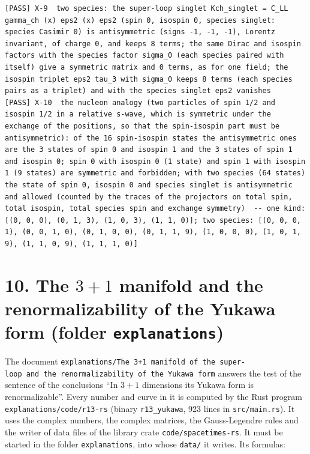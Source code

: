 \documentclass[
  10pt,
]{article}
\begin{document}
\begin{verbatim}
[PASS] X-9  two species: the super-loop singlet Kch_singlet = C_LL gamma_ch (x) eps2 (x) eps2 (spin 0, isospin 0, species singlet: species Casimir 0) is antisymmetric (signs -1, -1, -1), Lorentz invariant, of charge 0, and keeps 8 terms; the same Dirac and isospin factors with the species factor sigma_0 (each species paired with itself) give a symmetric matrix and 0 terms, as for one field; the isospin triplet eps2 tau_3 with sigma_0 keeps 8 terms (each species pairs as a triplet) and with the species singlet eps2 vanishes
[PASS] X-10  the nucleon analogy (two particles of spin 1/2 and isospin 1/2 in a relative s-wave, which is symmetric under the exchange of the positions, so that the spin-isospin part must be antisymmetric): of the 16 spin-isospin states the antisymmetric ones are the 3 states of spin 0 and isospin 1 and the 3 states of spin 1 and isospin 0; spin 0 with isospin 0 (1 state) and spin 1 with isospin 1 (9 states) are symmetric and forbidden; with two species (64 states) the state of spin 0, isospin 0 and species singlet is antisymmetric and allowed (counted by the traces of the projectors on total spin, total isospin, total species spin and exchange symmetry)  -- one kind: [(0, 0, 0), (0, 1, 3), (1, 0, 3), (1, 1, 0)]; two species: [(0, 0, 0, 1), (0, 0, 1, 0), (0, 1, 0, 0), (0, 1, 1, 9), (1, 0, 0, 0), (1, 0, 1, 9), (1, 1, 0, 9), (1, 1, 1, 0)]
\end{verbatim}

\hypertarget{the-31-manifold-and-the-renormalizability-of-the-yukawa-form-folder-explanations}{%
\section{\texorpdfstring{10. The \(3+1\) manifold and the
renormalizability of the Yukawa form (folder
\texttt{explanations})}{10. The 3+1 manifold and the renormalizability of the Yukawa form (folder explanations)}}\label{the-31-manifold-and-the-renormalizability-of-the-yukawa-form-folder-explanations}}

The document
\texttt{explanations/The\ 3+1\ manifold\ of\ the\ super-loop\ and\ the\ renormalizability\ of\ the\ Yukawa\ form}
answers the test of the sentence of the conclusions ``In \(3+1\)
dimensions its Yukawa form is renormalizable''. Every number and curve
in it is computed by the Rust program \texttt{explanations/code/r13-rs}
(binary \texttt{r13\_yukawa}, 923 lines in \texttt{src/main.rs}). It
uses the complex numbers, the complex matrices, the Gauss-Legendre rules
and the writer of data files of the library crate
\texttt{code/spacetimes-rs}. It must be started in the folder
\texttt{explanations}, into whose \texttt{data/} it writes. Its
formulas:
\end{document}
